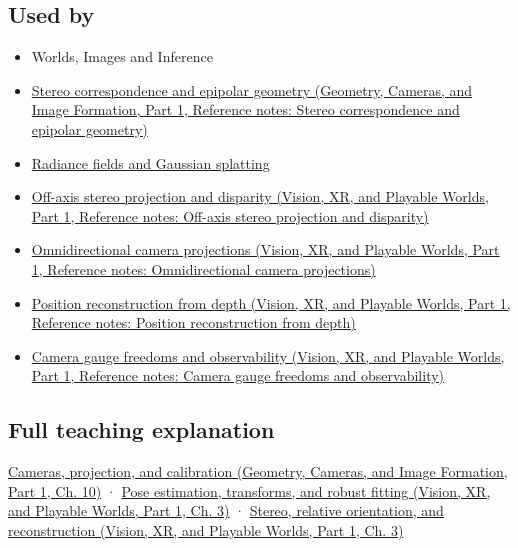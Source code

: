 \subsection{Used by}\label{appendix-3ee9861904d5-used-by}

\hypertarget{appendix-3ee9861904d5-used-by}{}

\begin{itemize}
\item
  {Worlds, Images and Inference}
\item
  \href{../03-Geometry-Cameras-and-Image-Formation-P01/main.pdf\#nameddest=appendix-c4e98b6e4001}{Stereo correspondence and epipolar geometry (Geometry, Cameras, and Image Formation, Part 1, Reference notes: Stereo correspondence and epipolar geometry)}
\item
  \hyperref[appendix-c5b332e400e7]{Radiance fields and Gaussian splatting}
\item
  \href{../07-Vision-XR-and-Playable-Worlds-P01/main.pdf\#nameddest=appendix-0976e86e5b9f}{Off-axis stereo projection and disparity (Vision, XR, and Playable Worlds, Part 1, Reference notes: Off-axis stereo projection and disparity)}
\item
  \href{../07-Vision-XR-and-Playable-Worlds-P01/main.pdf\#nameddest=appendix-fc99ad39f351}{Omnidirectional camera projections (Vision, XR, and Playable Worlds, Part 1, Reference notes: Omnidirectional camera projections)}
\item
  \href{../07-Vision-XR-and-Playable-Worlds-P01/main.pdf\#nameddest=appendix-2cbf2968e866}{Position reconstruction from depth (Vision, XR, and Playable Worlds, Part 1, Reference notes: Position reconstruction from depth)}
\item
  \href{../07-Vision-XR-and-Playable-Worlds-P01/main.pdf\#nameddest=appendix-113f0267e5f4}{Camera gauge freedoms and observability (Vision, XR, and Playable Worlds, Part 1, Reference notes: Camera gauge freedoms and observability)}
\end{itemize}

\subsection{Full teaching explanation}\label{appendix-3ee9861904d5-full-teaching-explanation}

\hypertarget{appendix-3ee9861904d5-full-teaching-explanation}{}

\href{../03-Geometry-Cameras-and-Image-Formation-P01/main.pdf\#nameddest=03-visual-computing-i-ch003-cameras-projection-and-calibration}{Cameras, projection, and calibration (Geometry, Cameras, and Image Formation, Part 1, Ch. 10)} · \href{../07-Vision-XR-and-Playable-Worlds-P01/main.pdf\#nameddest=04-visual-computing-ii-ch032-pose-estimation-transforms-and-robust-fitting}{Pose estimation, transforms, and robust fitting (Vision, XR, and Playable Worlds, Part 1, Ch. 3)} · \href{../07-Vision-XR-and-Playable-Worlds-P01/main.pdf\#nameddest=04-visual-computing-ii-ch032-stereo-relative-orientation-and-reconstruction}{Stereo, relative orientation, and reconstruction (Vision, XR, and Playable Worlds, Part 1, Ch. 3)}

